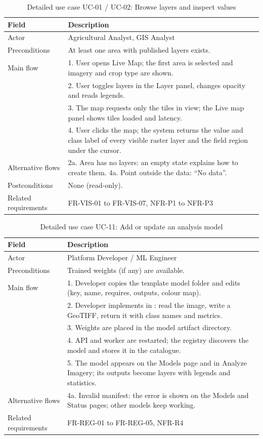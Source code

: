 \begin{table}[htbp]
\centering\small
\caption{Detailed use case UC-01 / UC-02: Browse layers and inspect values}
\label{tab:uc01}
\begin{tabularx}{\textwidth}{L{3.0cm} Y}
\toprule
\textbf{Field} & \textbf{Description}\\
\midrule
Actor & Agricultural Analyst, GIS Analyst\\
Preconditions & At least one area with published layers exists.\\
Main flow & 1. User opens Live Map; the first area is selected and imagery and crop type are shown.\\
 & 2. User toggles layers in the Layer panel, changes opacity and reads legends.\\
 & 3. The map requests only the tiles in view; the Live map panel shows tiles loaded and latency.\\
 & 4. User clicks the map; the system returns the value and class label of every visible raster layer and the field region under the cursor.\\
Alternative flows & 2a. Area has no layers: an empty state explains how to create them. 4a. Point outside the data: ``No data''.\\
Postconditions & None (read-only).\\
Related requirements & FR-VIS-01 to FR-VIS-07, NFR-P1 to NFR-P3\\
\bottomrule
\end{tabularx}
\end{table}

\begin{table}[htbp]
\centering\small
\caption{Detailed use case UC-11: Add or update an analysis model}
\label{tab:uc11}
\begin{tabularx}{\textwidth}{L{3.0cm} Y}
\toprule
\textbf{Field} & \textbf{Description}\\
\midrule
Actor & Platform Developer / ML Engineer\\
Preconditions & Trained weights (if any) are available.\\
Main flow & 1. Developer copies the template model folder and edits  (key, name, requires, outputs, colour map).\\
 & 2. Developer implements  in : read the image, write a GeoTIFF, return it with class names and metrics.\\
 & 3. Weights are placed in the model artifact directory.\\
 & 4. API and worker are restarted; the registry discovers the model and stores it in the catalogue.\\
 & 5. The model appears on the Models page and in Analyze Imagery; its outputs become layers with legends and statistics.\\
Alternative flows & 4a. Invalid manifest: the error is shown on the Models and Status pages; other models keep working.\\
Related requirements & FR-REG-01 to FR-REG-05, NFR-R4\\
\bottomrule
\end{tabularx}
\end{table}

